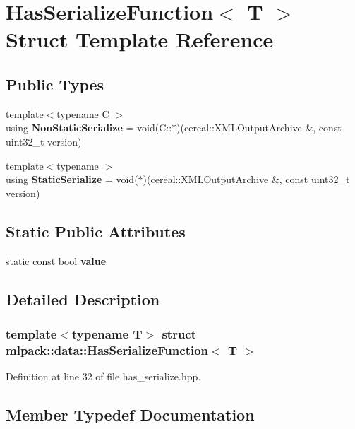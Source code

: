 \section{Has\+Serialize\+Function$<$ T $>$ Struct Template Reference}
\label{structmlpack_1_1data_1_1HasSerializeFunction}
\subsection*{Public Types}
\begin{DoxyCompactItemize}
\item 
{\footnotesize template$<$typename C $>$ }\\using \textbf{ Non\+Static\+Serialize} = void(C\+::$\ast$)(cereal\+::\+X\+M\+L\+Output\+Archive \&, const uint32\+\_\+t version)
\item 
{\footnotesize template$<$typename $>$ }\\using \textbf{ Static\+Serialize} = void($\ast$)(cereal\+::\+X\+M\+L\+Output\+Archive \&, const uint32\+\_\+t version)
\end{DoxyCompactItemize}
\subsection*{Static Public Attributes}
\begin{DoxyCompactItemize}
\item 
static const bool \textbf{ value}
\end{DoxyCompactItemize}


\subsection{Detailed Description}
\subsubsection*{template$<$typename T$>$\newline
struct mlpack\+::data\+::\+Has\+Serialize\+Function$<$ T $>$}



Definition at line 32 of file has\+\_\+serialize.\+hpp.



\subsection{Member Typedef Documentation}
\mbox{\label{structmlpack_1_1data_1_1HasSerializeFunction_aae165da8d6b21c90f92c6a5743ef2a34}} 
